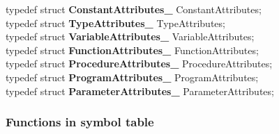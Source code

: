 \documentclass[12pt, a4paper]{report}
\begin{document}
\begin{enumerate}
						typedef struct \textbf{ConstantAttributes\_} ConstantAttributes;\\
						typedef struct \textbf{TypeAttributes\_} TypeAttributes;\\
						typedef struct \textbf{VariableAttributes\_} VariableAttributes;\\
						typedef struct \textbf{FunctionAttributes\_} FunctionAttributes;\\
						typedef struct \textbf{ProcedureAttributes\_} ProcedureAttributes;\\
						typedef struct \textbf{ProgramAttributes\_} ProgramAttributes;\\
						typedef struct \textbf{ParameterAttributes\_} ParameterAttributes;
					\end{enumerate}
				\subsubsection{Functions in symbol table}
\end{document}

